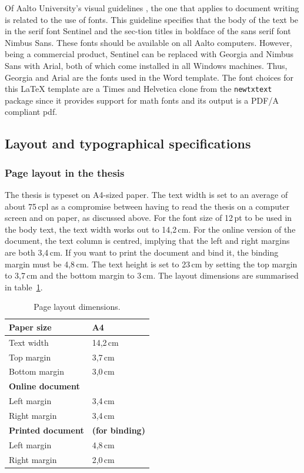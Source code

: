 \documentclass[english, 12pt, a4paper, elec, utf8, a-2b, online]{aaltothesis}
\begin{document}
Of Aalto University’s visual guidelines \cite{aaltovisual}, the one that applies
to document writing is related to the use of fonts. This guideline specifies 
that the body of the text be in the serif font Sentinel and the sec-tion titles 
in boldface of the sans serif font Nimbus Sans. These fonts should be available 
on all Aalto computers. However, being a commercial product, Sentinel can be 
replaced with Georgia and Nimbus Sans with Arial, both of which come installed 
in all Windows machines. Thus, Georgia and Arial are the fonts used in the Word 
template. The font choices for this \LaTeX{} template are a Times and Helvetica 
clone from the \verb+newtxtext+ package since it provides support for math fonts
and its output is a PDF/A compliant pdf.

\subsection*{Layout and typographical specifications}
\subsubsection*{Page layout in the thesis}

The thesis is typeset on A4-sized paper. The text width is set to an average of 
about 75\,cpl as a compromise between having to read the thesis on a computer 
screen and on paper, as discussed above. For the font size of 12\,pt to be used 
in the body text, the text width works out to 14,2\,cm. For the online version 
of the document, the text column is centred, implying that the left and right 
margins are both 3,4\,cm. If you want to print the document and bind it, the 
binding margin must be 4,8\,cm. The text height is set to 23\,cm by setting the 
top margin to 3,7\,cm and the bottom margin to 3\,cm. The layout dimensions are 
summarised in table~\ref{tab:layout}.

\begin{table}[htb]
	\centering
	\caption{Page layout dimensions.}
	\label{tab:layout}
	\sffamily%
	\begin{tabular}{ll}
		\hline
		Paper size & A4\\\hline
		Text width & 14,2\,cm \\\hline
		Top margin & 3,7\,cm \\\hline
		Bottom margin & 3,0\,cm \\\hline
		\textbf{Online document} & \\\hline
		Left margin & 3,4\,cm \\\hline
		Right margin & 3,4\,cm \\\hline
		\textbf{Printed document} & \textbf{(for binding)} \\\hline
		Left margin & 4,8\,cm \\\hline
		Right margin & 2,0\,cm \\\hline
	\end{tabular}
\end{table}
\end{document}
